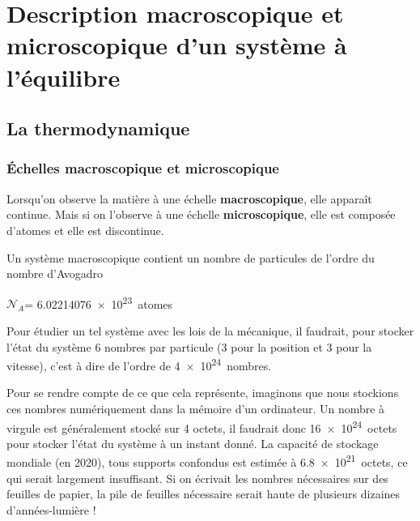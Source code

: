 \documentclass{cours}
\begin{document}
\newcommand{\Na}{\ensuremath{\mathcal{N}_A}}

\setcounter{chapter}{14}
\chapter{Description macroscopique et microscopique d'un système à l'équilibre}
\section{La thermodynamique}%
\label{sec:la_thermodynamique}

\subsection{Échelles macroscopique et microscopique}%
\label{sub:echelles_macroscopique_et_microscopique}

Lorsqu'on observe la matière à une échelle \textbf{macroscopique}, elle apparaît continue. Mais si on l'observe à une échelle \textbf{microscopique}, elle est composée d'atomes et elle est discontinue.

\begin{center}
\end{center}

Un système macroscopique contient un nombre de particules de l'ordre du nombre d'Avogadro 
\begin{eqencadre}
  \Na = \SI{6.02214076e23}{atomes}
\end{eqencadre}
Pour étudier un tel système avec les lois de la mécanique, il faudrait, pour stocker l'état du système 6 nombres par particule (3 pour la position et 3 pour la vitesse), c'est à dire de l'ordre de \SI{4e24}{nombres}. 

Pour se rendre compte de ce que cela représente, imaginons que nous stockions ces nombres numériquement dans la mémoire d'un ordinateur. Un nombre à virgule est généralement stocké sur 4 octets, il faudrait donc \SI{16e24}{octets} pour stocker l'état du système à un instant donné. La capacité de stockage mondiale (en 2020), tous supports confondus est estimée à \SI{6.8e21}{octets}, ce qui serait largement insuffisant. 
Si on écrivait les nombres nécessaires sur des feuilles de papier, la pile de feuilles nécessaire serait haute de plusieurs dizaines d'années-lumière !
\end{document}
